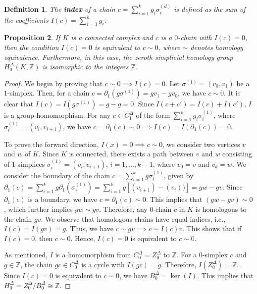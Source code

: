 \documentclass{amsart}
\newtheorem{definition}{Definition}[section]
\newtheorem{proposition}[definition]{Proposition}
\begin{document}
\begin{definition}
The \textbf{index} of a chain $c = \sum_{i=1}^{k} g_i \sigma_i^{(d)}$ is defined as the sum of the coefficients $I(c) = \sum_{i=1}^{k} g_i$.
\end{definition}

\begin{proposition}
\label{decomposition}
If $K$ is a connected complex and $c$ is a $0$-chain with $I(c) = 0$, then the condition $I(c) = 0$ is equivalent to $c \sim 0$, where $\sim$ denotes homology equivalence. Furthermore, in this case, the zeroth simplicial homology group $H^\Delta_0(K,\mathbb{Z})$ is isomorphic to the integers $\mathbb{Z}$.
\end{proposition}

\begin{proof}
We begin by proving that $c \sim 0 \implies I(c) = 0$. Let $\sigma^{(1)} = (v_0,v_1)$ be a $1$-simplex. Then, for a chain $c = \partial_1(g\sigma^{(1)}) = gv_1-gv_0$, we have $c \sim 0$. It is clear that $I(c) = I(g\sigma^{(1)}) = g-g = 0$. Since $I(c+c') = I(c) + I(c')$, $I$ is a group homomorphism. For any $c \in C^\Delta_1$ of the form $\sum_{i=1}^{k} g_i \sigma_i^{(1)}$, where $\sigma_i^{(1)} = (v_i,v_{i+1})$, we have $c = \partial_1(c) \sim 0 \implies I(c) = I(\partial_1(c)) = 0$.

To prove the forward direction, $I(x) = 0 \implies c \sim 0$, we consider two vertices $v$ and $w$ of $K$. Since $K$ is connected, there exists a path between $v$ and $w$ consisting of $1$-simplices $\sigma_i^{(1)} = (v_i,v_{i+1})$, $i=1,\ldots,k-1$, where $v_0 = v$ and $v_k = w$. We consider the boundary of the chain $c = \sum_{i=1}^{k} g \sigma_i^{(1)}$, given by $\partial_1(c) = \sum_{i=1}^{k}g \partial_1(\sigma_i^{(1)}) = \sum_{i=1}^{k}g [(v_{i+1}) - (v_i))] = gw - gv$. Since $\partial_1(c)$ is a boundary, we have $c = \partial_1(c) \sim 0$. This implies that $(gw-gv) \sim 0$, which further implies $gw \sim gv$. Therefore, any $0$-chain $c$ in $K$ is homologous to the chain $gv$. We observe that homologous chains have equal indices, i.e., $I(c) = I(gv) = g$. Thus, we have $c \sim gv \implies c \sim I(c)v$. This shows that if $I(c) = 0$, then $c \sim 0$. Hence, $I(c) = 0$ is equivalent to $c \sim 0$.

As mentioned, $I$ is a homomorphism from $C^\Delta_0 = Z^\Delta_0$ to $\mathbb{Z}$. For a $0$-simplex $c$ and $g \in \mathbb{Z}$, the chain $gc \in C^\Delta_0$ is a cycle with $I(gc) = g$. Therefore, $I(Z^\Delta_0) = \mathbb{Z}$. Since $I(c) = 0$ is equivalent to $c \sim 0$, we have $B^\Delta_0 = \ker(I)$. This implies that $H^\Delta_0 = Z^\Delta_0/B^\Delta_0 \cong \mathbb{Z}$.
\end{proof}
\end{document}

